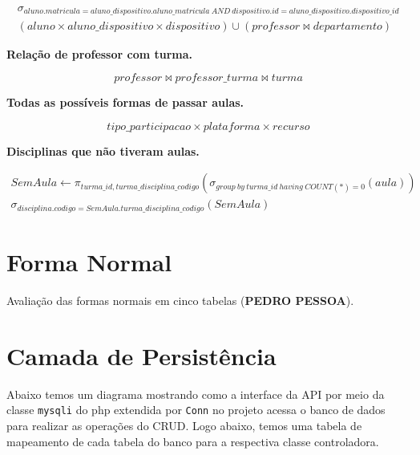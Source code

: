 \documentclass[12pt]{article}
\begin{document}
\begin{equation}
\begin{split}
    \sigma_{aluno.matricula = aluno\_dispositivo.aluno\_matricula\ AND\ dispositivo.id = aluno\_dispositivo.dispositivo\_id} \\
    (aluno \times aluno\_dispositivo \times dispositivo) \cup (professor \bowtie departamento)
\end{split}
\end{equation}

\noindent \textbf{Relação de professor com turma.}

\begin{equation}
    professor \bowtie professor\_turma \bowtie turma
\end{equation}

\noindent \textbf{Todas as possíveis formas de passar aulas.}

\begin{equation}
    tipo\_participacao \times plataforma \times recurso
\end{equation}

\noindent \textbf{Disciplinas que não tiveram aulas.}

\begin{equation}
\begin{split}
    SemAula \leftarrow \pi_{turma\_id, turma\_disciplina\_codigo}(\sigma_{group\ by\ turma\_id\ having\ COUNT(*) = 0}(aula)) \\
    \sigma_{disciplina.codigo = SemAula.turma\_disciplina\_codigo}(SemAula)
\end{split}
\end{equation}

\section*{Forma Normal}
Avaliação das formas normais em cinco tabelas (\textbf{PEDRO PESSOA}).

\newpage

\section*{Camada de Persistência}
Abaixo temos um diagrama mostrando como a interface da API por meio da classe \texttt{mysqli} do php extendida por \texttt{Conn} no projeto acessa o banco de dados para realizar as operações do CRUD. Logo abaixo, temos uma tabela de mapeamento de cada tabela do banco para a respectiva classe controladora.
\end{document}
